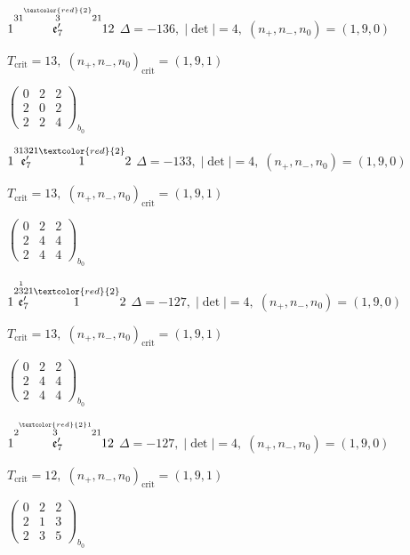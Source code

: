 \documentclass[10pt]{article}
\begin{document}
$1\overset{31\overset{\textcolor{red}{2}}{3}21}{\mathfrak{e}_7'}12$ \quad $\Delta=-136,\; |\det|=4,\; (n_+,n_-,n_0)=(1,9,0)$

\hspace{1em}$T_{\text{crit}}=13,\; (n_+,n_-,n_0)_{\text{crit}}=(1,9,1)$

\hspace{2em}$\left(\begin{smallmatrix}0 & 2 & 2 \\ 2 & 0 & 2 \\ 2 & 2 & 4\end{smallmatrix}\right)_{\!b_0}$

$1\overset{31321}{\mathfrak{e}_7'}\overset{\textcolor{red}{2}}{1}2$ \quad $\Delta=-133,\; |\det|=4,\; (n_+,n_-,n_0)=(1,9,0)$

\hspace{1em}$T_{\text{crit}}=13,\; (n_+,n_-,n_0)_{\text{crit}}=(1,9,1)$

\hspace{2em}$\left(\begin{smallmatrix}0 & 2 & 2 \\ 2 & 4 & 4 \\ 2 & 4 & 4\end{smallmatrix}\right)_{\!b_0}$

\smallskip

$1\overset{2\overset{1}{3}21}{\mathfrak{e}_7'}\overset{\textcolor{red}{2}}{1}2$ \quad $\Delta=-127,\; |\det|=4,\; (n_+,n_-,n_0)=(1,9,0)$

\hspace{1em}$T_{\text{crit}}=13,\; (n_+,n_-,n_0)_{\text{crit}}=(1,9,1)$

\hspace{2em}$\left(\begin{smallmatrix}0 & 2 & 2 \\ 2 & 4 & 4 \\ 2 & 4 & 4\end{smallmatrix}\right)_{\!b_0}$

$1\overset{2\overset{\textcolor{red}{2}1}{3}21}{\mathfrak{e}_7'}12$ \quad $\Delta=-127,\; |\det|=4,\; (n_+,n_-,n_0)=(1,9,0)$

\hspace{1em}$T_{\text{crit}}=12,\; (n_+,n_-,n_0)_{\text{crit}}=(1,9,1)$

\hspace{2em}$\left(\begin{smallmatrix}0 & 2 & 2 \\ 2 & 1 & 3 \\ 2 & 3 & 5\end{smallmatrix}\right)_{\!b_0}$
\end{document}
